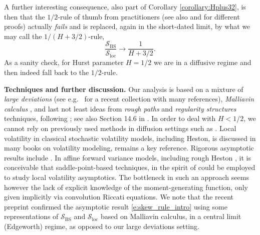\documentclass[11pt]{article}
\theoremstyle{plain}
\theoremstyle{definition}
\theoremstyle{remark}
\newcommand{\be}{\beta}
\newcommand{\1}{\mathbf{1}}
\newcommand{\Sbs}{\mathcal{S}_\mathrm{BS}}
\newcommand{\Sloc}{\mathcal{S}_\mathrm{loc}}
\numberwithin{equation}{section}
\def\be{\begin{equation}}
\def\ee{\end{equation}}
\def\S{\mathcal S}
\begin{document}
A further interesting consequence, also part of Corollary \ref{corollary:Hplus32}, is then that the $1/2$-rule of thumb from practitioners \cite{Derman96}
(see also \cite{gatheral2006volatility} and \cite[Remark 3.4]{fukasawa2020} for different proofs)
actually {\em fails} and is replaced, again in the short-dated limit, by what we may call the $1/(H+3/2)$-rule,
\be \label{e:skew_rule_intro}
\frac{\Sbs}{\Sloc} 
\to
\frac{1}{H+3/2}. %
\ee
As a sanity check, for Hurst parameter $H=1/2$ we are in a diffusive regime and then indeed fall back to the $1/2$-rule.

{\bf Techniques and further discussion.}
Our analysis is based on a mixture of {\it large deviations} (see e.g.\ \cite{friz2015large} for a recent collection with many references),  {\em Malliavin calculus} \cite{bally:inria-00071868,Nualart:06,fournie2001applications}, and last not least ideas from {\em rough paths} and {\em regularity structures} techniques, following \cite{bayer2017regularity, friz2018precise1,friz2021short}; see also Section 14.6 in \cite{friz2020course}. In order to deal with $H<1/2$, we cannot rely on previously used methods in diffusion settings such as \cite{takanobu1993asymptotic, de2018local}. Local volatility in classical stochastic volatility models, including Heston, is discussed in many books on volatility modeling, \cite{gatheral2006volatility} remains a key reference. Rigorous asymptotic results include \cite{ghlow, de2013rational,de2018local}. In affine forward variance models, including rough Heston \cite{euch2016characteristic, gatheral2019affine}, it is conceivable that saddle-point-based techniques, in the spirit of \cite{de2013rational} could be employed to study local volatility asymptotics. The bottleneck in such an approach seems however the lack of explicit knowledge of the moment-generating function, only given implicitly via convolution Riccati equations. %
We note that the recent preprint \cite{AlosEtAl2022} confirmed the asymptotic result \eqref{e:skew_rule_intro} using some representations of  $\Sbs$ and $\Sloc$ based on Malliavin calculus,
in a central limit (Edgeworth) regime, as opposed to our large deviations setting.
 
\end{document}
